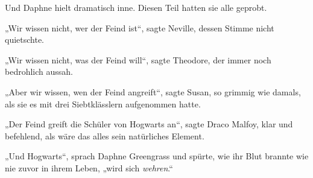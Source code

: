 Und Daphne hielt dramatisch inne. Diesen Teil hatten sie alle geprobt.

„Wir wissen nicht, wer der Feind ist“, sagte Neville, dessen Stimme nicht quietschte.

„Wir wissen nicht, was der Feind will“, sagte Theodore, der immer noch bedrohlich aussah.

„Aber wir wissen, wen der Feind angreift“, sagte Susan, so grimmig wie damals, als sie es mit drei Siebtklässlern aufgenommen hatte.

„Der Feind greift die Schüler von Hogwarts an“, sagte Draco Malfoy, klar und befehlend, als wäre das alles sein natürliches Element.

„Und Hogwarts“, sprach Daphne Greengrass und spürte, wie ihr Blut brannte wie nie zuvor in ihrem Leben, „wird sich \emph{wehren}.“

